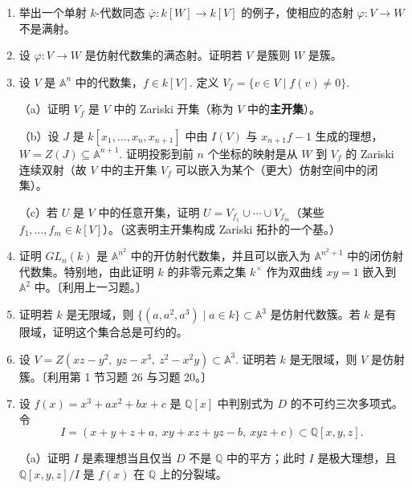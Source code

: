 \begin{enumerate}
（c）举出一个在 Euclid 拓扑下闭但在 Zariski 拓扑下不闭的集合的例子，即不是仿射代数集（故 Euclid 拓扑比 Zariski 拓扑「更精细」）。

\item 举出一个单射 \(k\)-代数同态 \(\bar\varphi : k[W] \to k[V]\) 的例子，使相应的态射 \(\varphi : V \to W\) 不是满射。

\item 设 \(\varphi : V \to W\) 是仿射代数集的满态射。证明若 \(V\) 是簇则 \(W\) 是簇。

\item 设 \(V\) 是 \(\mathbb{A}^n\) 中的代数集，\(f \in k[V]\). 定义 \(V_f = \{v \in V \mid f(v) \neq 0\}\).

（a）证明 \(V_f\) 是 \(V\) 中的 Zariski 开集（称为 \(V\) 中的\textbf{主开集}）。

（b）设 \(J\) 是 \(k[x_1, \ldots, x_n, x_{n+1}]\) 中由 \(I(V)\) 与 \(x_{n+1}f-1\) 生成的理想，\(W = Z(J) \subseteq \mathbb{A}^{n+1}\). 证明投影到前 \(n\) 个坐标的映射是从 \(W\) 到 \(V_f\) 的 Zariski 连续双射（故 \(V\) 中的主开集 \(V_f\) 可以嵌入为某个（更大）仿射空间中的闭集）。

（c）若 \(U\) 是 \(V\) 中的任意开集，证明 \(U = V_{f_1} \cup \cdots \cup V_{f_m}\)（某些 \(f_1, \ldots, f_m \in k[V]\)）。（这表明主开集构成 Zariski 拓扑的一个基。）

\item 证明 \(GL_n(k)\) 是 \(\mathbb{A}^{n^2}\) 中的开仿射代数集，并且可以嵌入为 \(\mathbb{A}^{n^2+1}\) 中的闭仿射代数集。特别地，由此证明 \(k\) 的非零元素之集 \(k^\times\) 作为双曲线 \(xy = 1\) 嵌入到 \(\mathbb{A}^2\) 中。〔利用上一习题。〕

\item 证明若 \(k\) 是无限域，则 \(\{(a, a^2, a^3) \mid a \in k\} \subset \mathbb{A}^3\) 是仿射代数簇。若 \(k\) 是有限域，证明这个集合总是可约的。

\item 设 \(V = Z(xz-y^2,\ yz-x^3,\ z^2-x^2y) \subset \mathbb{A}^3\). 证明若 \(k\) 是无限域，则 \(V\) 是仿射簇。〔利用第 1 节习题 26 与习题 20。〕

\item 设 \(f(x) = x^3+ax^2+bx+c\) 是 \(\mathbb{Q}[x]\) 中判别式为 \(D\) 的不可约三次多项式。令
\[
I = (x+y+z+a,\ xy+xz+yz-b,\ xyz+c) \subset \mathbb{Q}[x,y,z].
\]

（a）证明 \(I\) 是素理想当且仅当 \(D\) 不是 \(\mathbb{Q}\) 中的平方；此时 \(I\) 是极大理想，且 \(\mathbb{Q}[x,y,z]/I\) 是 \(f(x)\) 在 \(\mathbb{Q}\) 上的分裂域。


\end{enumerate}
